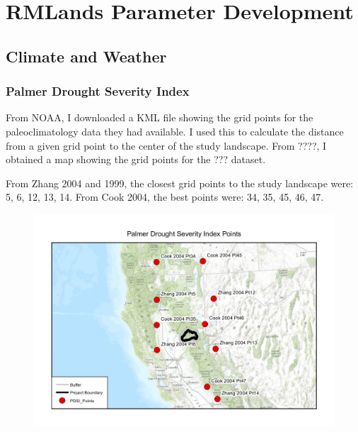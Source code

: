 \chapter{RMLands Parameter Development}
\section{Climate and Weather}
\subsection{Palmer Drought Severity Index}
From NOAA, I downloaded a KML file showing the grid points for the paleoclimatology data they had available. I used this to calculate the distance from a given grid point to the center of the study landscape. From ????, I obtained a map showing the grid points for the ??? dataset.

From Zhang 2004 and 1999, the closest grid points to the study landscape were: 5, 6, 12, 13, 14. From Cook 2004, the best points were: 34, 35, 45, 46, 47.

\begin{figure}[h]
\centering
\includegraphics[width=\textwidth]{PDSIPointMap}
\end{figure}

